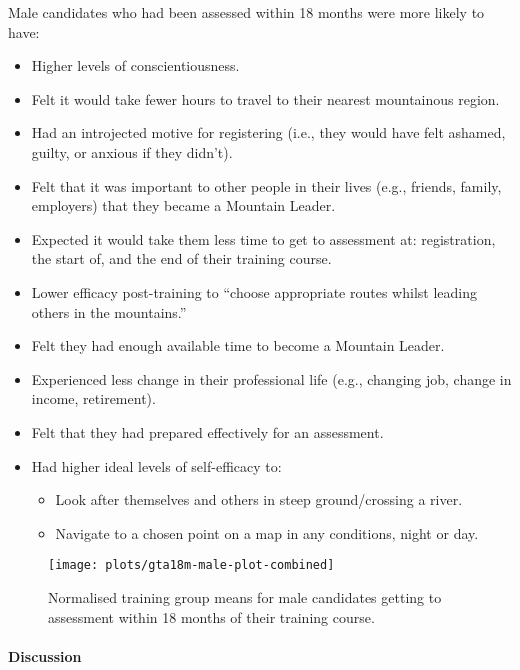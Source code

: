 \documentclass[
  12pt,
  a4paper,
]{book}
\providecommand{\tightlist}{%
  \setlength{\itemsep}{0pt}\setlength{\parskip}{0pt}}
\begin{document}
Male candidates who had been assessed within 18 months were more likely to have:

\begin{itemize}
\tightlist
\item
  Higher levels of conscientiousness.
\item
  Felt it would take fewer hours to travel to their nearest mountainous region.
\item
  Had an introjected motive for registering (i.e., they would have felt ashamed, guilty, or anxious if they didn't).
\item
  Felt that it was important to other people in their lives (e.g., friends, family, employers) that they became a Mountain Leader.
\item
  Expected it would take them less time to get to assessment at: registration, the start of, and the end of their training course.
\item
  Lower efficacy post-training to ``choose appropriate routes whilst leading others in the mountains.''
\item
  Felt they had enough available time to become a Mountain Leader.
\item
  Experienced less change in their professional life (e.g., changing job, change in income, retirement).
\item
  Felt that they had prepared effectively for an assessment.
\item
  Had higher ideal levels of self-efficacy to:

  \begin{itemize}
  \tightlist
  \item
    Look after themselves and others in steep ground/crossing a river.
  \item
    Navigate to a chosen point on a map in any conditions, night or day.
  \end{itemize}
\end{itemize}

\begin{figure}[H]
\texttt{[image: plots/gta18m-male-plot-combined]} \caption{Normalised training group means for male candidates getting to assessment within 18 months of their training course.}\label{fig:gta18m-male-plot}
\end{figure}

\hypertarget{mts-part-b-male-gta-discussion}{%
\paragraph{Discussion}\label{mts-part-b-male-gta-discussion}}
\end{document}
